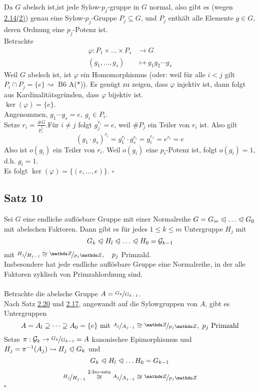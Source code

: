\\
Da $G$ abelsch ist,ist jede Sylow-$p_j$-gruppe in $G$ normal, also gibt es (wegen \hyperref[sub:def_sylow_gruppe]{2.14(2)}) genau eine Sylow-$p_j$-Gruppe $P_j\subseteq G$, und $P_j$ enthält alle Elemente $g\in G$, deren Ordnung eine $p_j$-Potenz ist.\\
Betrachte
\begin{equation*}
\begin{aligned}
	\varphi:P_1\times\dots\times P_s&\to G\\
	(g_1,\dots,g_s)&\mapsto g_1g_2\cdots g_s
\end{aligned}
\end{equation*}
Weil $G$ abelsch ist, ist $\varphi$ ein Homomorphismus (oder: weil für alle $i<j$ gilt $P_i\cap P_j=\{e\}\rightsquigarrow$ B6 A($\ast$)). Es genügt zu zeigen, dass $\varphi$ injektiv ist, dann folgt aus Kardinalitätsgründen, dass $\varphi$ bijektiv ist.\\
\zz  $\ker(\varphi)=\{e\}$.\\
Angenommen, $g_1\cdots g_s=e,~ g_i\in P_i$.\\
Setze $r_i=\frac{\#G}{p_i^{l_i}}$.Für $i\neq j$ folgt $g_j^{r_i}=e$, weil $\#P_j$ ein Teiler von $r_i$ ist. Also gilt \[ (g_1\cdot g_s)^{r_i}=g_1^{r_i}\cdot g_s^{r_i}=g_i^{r_1}=e^{r_i}=e \]
Also ist $o(g_i)$ ein Teiler von $r_i$. Weil $o(g_i)$ eine $p_i$-Potenz ist, folgt $o(g_i)=1$, d.h. $g_i=1$.\\
Es folgt $\ker(\varphi)=\{(e,\dots,e)\}$.
\hfill $\square$

\subsection{Satz 10}
\label{sub:satz_10}
Sei $G$ eine endliche auflösbare Gruppe mit einer Normalreihe $G=G_m\nt\dots\nt G_0$ mit abelschen Faktoren. Dann gibt es für jedes $1\le k\le m$ Untergruppe $H_j$ mit
\[
G_k\nt H_l\nt\dots\nt H_0=\G_{k-1}
\]
mit $\nicefrac{H_j}{H_{j-1}}\cong \nicefrac{\Z}{p_j\Z},\quad p_j$ Primzahl.\\
Insbesondere hat jede endliche auflösbare Gruppe eine Normalreihe, in der alle Faktoren zyklisch von Primzahlordnung sind.\\

\\
Betrachte die abelsche Gruppe $A=\nicefrac{G_k}{G_{k-1}}$.\\
Nach Satz \hyperref[sub:satz_9]{2.20} und \hyperref[sub:lemma_4]{2.17}, angewandt auf die Sylowgruppen von $A$, gibt es Untergruppen
\[
A=A_l\supseteq \dots\supseteq A_0=\{e\}\text{ mit } \nicefrac{A_j}{A_{j-1}}\cong\nicefrac{\Z}{p_j\Z},~p_j\text{ Primzahl}
\] 
Setze $\pi:\mathcal{G}_k\to\nicefrac{G_k}{G_{k-1}}=A$ kanonischee Epimorphismus und $H_j=\pi^{-1}(A_j)\rightsquigarrow H_j\trianglelefteqslant G_k$ und
\[
G_k\trianglelefteqslant H_l\trianglelefteqslant \dots H_0=G_{k-1}
\]
\[
\nicefrac{H_j}{H_{j-1}}\stackrel{\text{2.Iso-satz}}{\cong} \nicefrac{A_j}{A_{j-1}} \cong \nicefrac{\Z}{p_j\Z}
\]
\hfill $\square$

